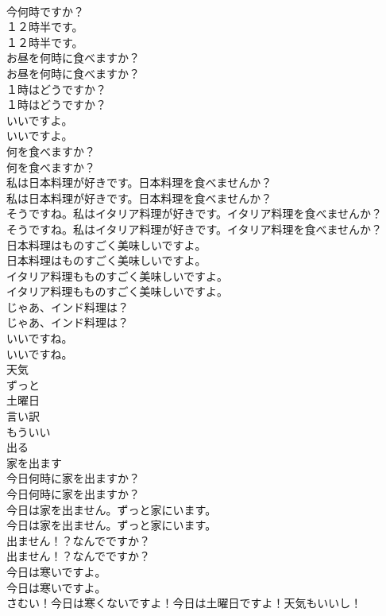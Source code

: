 \documentclass[8pt]{extreport}
\begin{document}
\begin{CJK}{UTF8}{min}
\\	今何時ですか？ 
\\	１２時半です。	
\\	１２時半です。 
\\	お昼を何時に食べますか？	
\\	お昼を何時に食べますか？ 
\\	１時はどうですか？	
\\	１時はどうですか？ 
\\	いいですよ。	
\\	いいですよ。 
\\	何を食べますか？	
\\	何を食べますか？ 
\\	私は日本料理が好きです。日本料理を食べませんか？	
\\	私は日本料理が好きです。日本料理を食べませんか？ 
\\	そうですね。私はイタリア料理が好きです。イタリア料理を食べませんか？	
\\	そうですね。私はイタリア料理が好きです。イタリア料理を食べませんか？ 
\\	日本料理はものすごく美味しいですよ。	
\\	日本料理はものすごく美味しいですよ。 
\\	イタリア料理もものすごく美味しいですよ。	
\\	イタリア料理もものすごく美味しいですよ。 
\\	じゃあ、インド料理は？	
\\	じゃあ、インド料理は？ 
\\	いいですね。	
\\	いいですね。 
\\	天気
\\	ずっと
\\	土曜日
\\	言い訳
\\	もういい
\\	出る
\\	家を出ます
\\	今日何時に家を出ますか？	
\\	今日何時に家を出ますか？ 
\\	今日は家を出ません。ずっと家にいます。	
\\	今日は家を出ません。ずっと家にいます。 
\\	出ません！？なんでですか？	
\\	出ません！？なんでですか？ 
\\	今日は寒いですよ。	
\\	今日は寒いですよ。 
\\	さむい！今日は寒くないですよ！今日は土曜日ですよ！天気もいいし！	

\end{CJK}
\end{document}
